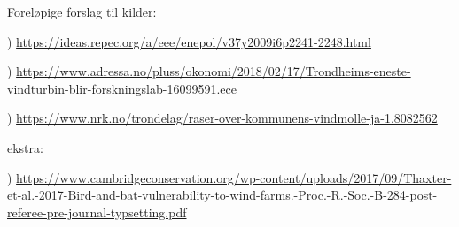 Foreløpige forslag til kilder:

) \url{https://ideas.repec.org/a/eee/enepol/v37y2009i6p2241-2248.html}

) \url{https://www.adressa.no/pluss/okonomi/2018/02/17/Trondheims-eneste-vindturbin-blir-forskningslab-16099591.ece}

) \url{https://www.nrk.no/trondelag/raser-over-kommunens-vindmolle-ja-1.8082562}

ekstra:

) \url{https://www.cambridgeconservation.org/wp-content/uploads/2017/09/Thaxter-et-al.-2017-Bird-and-bat-vulnerability-to-wind-farms.-Proc.-R.-Soc.-B-284-post-referee-pre-journal-typsetting.pdf}